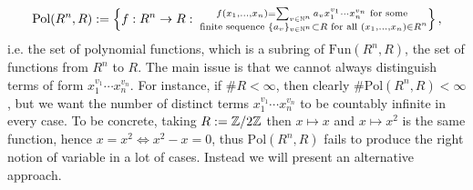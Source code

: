$$\text{Pol}(R^n,R):= \left\{ f : R^n\rightarrow R : \substack{f(x_1,\dots,x_n) = \sum_{v\in \mathbb{N}^n} a_vx_1^{v_1}\cdots x_n^{v_n} \text{ for some}\\ \text{ finite sequence } \{a_v\}_{v\in\mathbb{N}^n}\subset R  \text{ for all } (x_1,\dots,x_n)\in R^n} \right\},$$
i.e. the set of polynomial functions, which is a subring of $\text{Fun}(R^n,R)$, the set of functions from $R^n$ to $R$. The main issue is that we cannot always distinguish terms of form $x_1^{v_1}\cdots x_n^{v_n}$. For instance, if $\#R < \infty$, then clearly $\#\text{Pol}(R^n,R) < \infty$, but we want the number of distinct terms $x_1^{v_1}\cdots x_n^{v_n}$ to be countably infinite in every case. To be concrete, taking $R := \mathbb{Z}/2\mathbb{Z}$ then $x\mapsto x$ and $x\mapsto x^2$ is the same function, hence $x = x^2 \iff x^2-x = 0$, thus $\text{Pol}(R^n,R)$ fails to produce the right notion of variable in a lot of cases. Instead we will present an alternative approach.  

